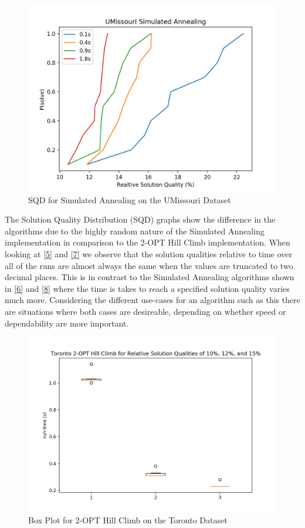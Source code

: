 \documentclass[format=sigconf]{acmart}
\begin{document}
\begin{figure}[htbp]
    \centerline{\includegraphics[scale=.5]{graphs/UMissouri_LS2_SQD.png}}
    \caption{SQD for Simulated Annealing on the UMissouri Dataset}
    \label{fig8}
\end{figure}
The Solution Quality Distribution (SQD) graphs show the difference in the algorithms due to the 
highly random nature of the Simulated Annealing implementation in comparison to the 2-OPT Hill Climb 
implementation. When looking at \ref{5} and \ref{7} we observe that the solution qualities relative to time over all of 
the runs are almost always the same when the values are truncated to two decimal places. This is in contrast to the 
Simulated Annealing algorithms shown in \ref{6} and \ref{8} where the time is takes to reach a specified solution quality 
varies much more. Considering the different use-cases for an algorithm such as this there are situations where both cases are desireable, 
depending on whether speed or dependability are more important.
\begin{figure}[htbp]
    \centerline{\includegraphics[scale=.5]{graphs/Toronto_LS1_Box.png}}
    \caption{Box Plot for 2-OPT Hill Climb on the Toronto Dataset}
    \label{fig9}
\end{figure}
\end{document}
